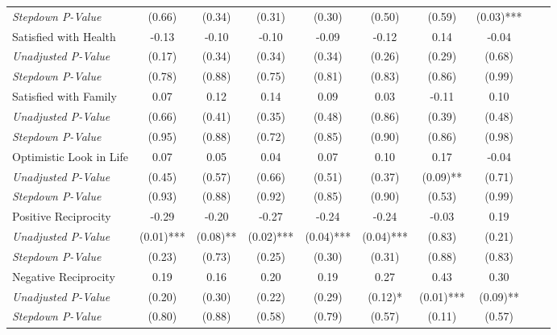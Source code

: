 \begin{tabular}{l c c c c c c c c c}
\quad \textit{Stepdown P-Value} & (0.66) & (0.34) & (0.31) & (0.30) & (0.50) & (0.59) & (0.03)*** \\
Satisfied with Health & -0.13 & -0.10 & -0.10 & -0.09 & -0.12 & 0.14 & -0.04 \\
\quad \textit{Unadjusted P-Value} & (0.17) & (0.34) & (0.34) & (0.34) & (0.26) & (0.29) & (0.68) \\
\quad \textit{Stepdown P-Value} & (0.78) & (0.88) & (0.75) & (0.81) & (0.83) & (0.86) & (0.99) \\
Satisfied with Family & 0.07 & 0.12 & 0.14 & 0.09 & 0.03 & -0.11 & 0.10 \\
\quad \textit{Unadjusted P-Value} & (0.66) & (0.41) & (0.35) & (0.48) & (0.86) & (0.39) & (0.48) \\
\quad \textit{Stepdown P-Value} & (0.95) & (0.88) & (0.72) & (0.85) & (0.90) & (0.86) & (0.98) \\
Optimistic Look in Life & 0.07 & 0.05 & 0.04 & 0.07 & 0.10 & 0.17 & -0.04 \\
\quad \textit{Unadjusted P-Value} & (0.45) & (0.57) & (0.66) & (0.51) & (0.37) & (0.09)** & (0.71) \\
\quad \textit{Stepdown P-Value} & (0.93) & (0.88) & (0.92) & (0.85) & (0.90) & (0.53) & (0.99) \\
Positive Reciprocity & -0.29 & -0.20 & -0.27 & -0.24 & -0.24 & -0.03 & 0.19 \\
\quad \textit{Unadjusted P-Value} & (0.01)*** & (0.08)** & (0.02)*** & (0.04)*** & (0.04)*** & (0.83) & (0.21) \\
\quad \textit{Stepdown P-Value} & (0.23) & (0.73) & (0.25) & (0.30) & (0.31) & (0.88) & (0.83) \\
Negative Reciprocity & 0.19 & 0.16 & 0.20 & 0.19 & 0.27 & 0.43 & 0.30 \\
\quad \textit{Unadjusted P-Value} & (0.20) & (0.30) & (0.22) & (0.29) & (0.12)* & (0.01)*** & (0.09)** \\
\quad \textit{Stepdown P-Value} & (0.80) & (0.88) & (0.58) & (0.79) & (0.57) & (0.11) & (0.57) \\
\bottomrule
\end{tabular}
